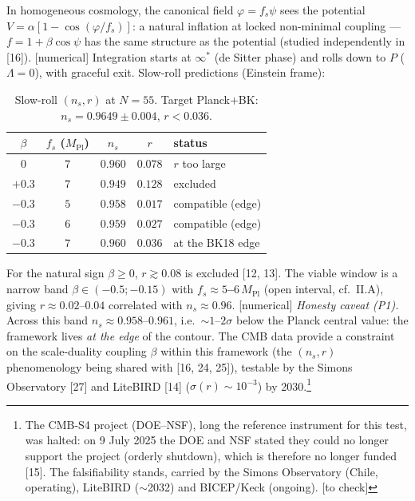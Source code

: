\documentclass[11pt,a4paper]{article}
\newcommand{\statut}[1]{{\footnotesize\textsf{[#1]}}}
\newcommand{\Mpl}{M_{\mathrm{Pl}}}
\theoremstyle{definition}
\begin{document}
In homogeneous cosmology, the canonical field $\varphi=f_s\psi$ sees the potential
$V=\alpha[1-\cos(\varphi/f_s)]$: a natural inflation at locked non-minimal coupling ---
$f=1+\beta\cos\psi$ has the same structure as the potential (studied independently in [16]).
\statut{numerical} Integration starts at $\infty^*$ (de Sitter phase) and rolls down to $P$
($\Lambda=0$), with graceful exit. Slow-roll predictions (Einstein frame):

\begin{table}[h]\centering\small
\begin{tabular}{ccccl}
\toprule
$\beta$ & $f_s$ ($\Mpl$) & $n_s$ & $r$ & status\\
\midrule
$0$ & $7$ & $0.960$ & $0.078$ & $r$ too large\\
$+0.3$ & $7$ & $0.949$ & $0.128$ & excluded\\
$-0.3$ & $5$ & $0.958$ & $0.017$ & compatible (edge)\\
$-0.3$ & $6$ & $0.959$ & $0.027$ & compatible (edge)\\
$-0.3$ & $7$ & $0.960$ & $0.036$ & at the BK18 edge\\
\bottomrule
\end{tabular}
\caption{\small Slow-roll $(n_s,r)$ at $N=55$. Target Planck$+$BK: $n_s=0.9649\pm0.004$,
$r<0.036$.}\label{tab:nsr}
\end{table}

For the natural sign $\beta\ge0$, $r\gtrsim0.08$ is excluded [12, 13]. The viable window is a
narrow band $\beta\in(-0.5;-0.15)$ with \textbf{$f_s\approx5$--$6\,\Mpl$} (open interval, cf.\
II.A), giving $r\approx0.02$--$0.04$ correlated with $n_s\approx0.96$. \statut{numerical}
\emph{Honesty caveat (P1).} Across this band $n_s\approx0.958$--$0.961$, i.e.\ $\sim1$--$2\sigma$
below the Planck central value: the framework lives \emph{at the edge} of the contour. The CMB
data provide a constraint on the scale-duality coupling $\beta$ within this framework (the
$(n_s,r)$ phenomenology being shared with [16, 24, 25]), testable by the Simons Observatory
[27] and LiteBIRD [14] ($\sigma(r)\sim10^{-3}$) by 2030.\footnote{The CMB-S4 project
(DOE--NSF), long the reference instrument for this test, was halted: on 9 July 2025 the DOE
and NSF stated they could no longer support the project (orderly shutdown), which is therefore
no longer funded [15]. The falsifiability stands, carried by the Simons Observatory (Chile,
operating), LiteBIRD ($\sim$2032) and BICEP/Keck (ongoing). \statut{to check}}
\end{document}

